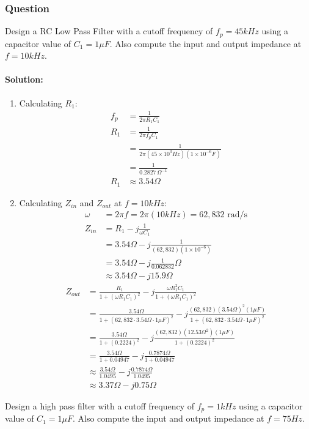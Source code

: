 \subsubsection{Question}
Design a RC Low Pass Filter with a cutoff frequency of
\(f_p = 45kHz\) using a capacitor value of \(C_1 = 1\mu F\).
Also compute the input and output impedance at
\(f = 10kHz\).
\paragraph{Solution:}
\begin{enumerate}
  \item Calculating \(R_1\):
    \begin{align*}
      f_p &= \frac{1}{2 \pi R_1 C_1} \\
      R_1 &= \frac{1}{2 \pi f_p C_1} \\
      &= \frac{1}{2 \pi (45 \times 10^3 Hz)(1 \times 10^{-6} F)} \\
      &= \frac{1}{0.2827 \, \Omega^{-1}} \\
      R_1 &\approx 3.54 \Omega
    \end{align*}
  \item Calculating \(Z_{in}\) and \(Z_{out}\) at \(f = 10kHz\):
    \begin{align*}
      \omega &= 2 \pi f = 2 \pi (10kHz) = 62,832 \text{ rad/s} \\
      Z_{in} &= R_1 - j \frac{1}{\omega C_1} \\
             &= 3.54 \Omega - j \frac{1}{(62,832)(1 \times 10^{-6})} \\
             &= 3.54 \Omega - j \frac{1}{0.062832} \Omega \\
             &\approx 3.54 \Omega - j 15.9 \Omega
    \end{align*}
    \begin{align*}
            Z_{out} &= \frac{R_1}{1 + (\omega R_1 C_1)^2} - j \frac{\omega R_1^2 C_1}{1 + (\omega R_1 C_1)^2} \\
              &= \frac{3.54 \Omega}{1 + (62,832 \cdot 3.54 \Omega \cdot 1\mu F)^2} - j \frac{(62,832)(3.54 \Omega)^2 (1\mu F)}{1 + (62,832 \cdot 3.54 \Omega \cdot 1\mu F)^2} \\
              &= \frac{3.54 \Omega}{1 + (0.2224)^2} - j \frac{(62,832)(12.53 \Omega^2)(1\mu F)}{1 + (0.2224)^2} \\
              &= \frac{3.54 \Omega}{1 + 0.04947} - j \frac{0.7874 \Omega}{1 + 0.04947} \\
              &\approx \frac{3.54 \Omega}{1.0495} - j \frac{0.7874 \Omega}{1.0495} \\
              &\approx 3.37 \Omega - j 0.75 \Omega
    \end{align*}
\end{enumerate}
Design a high pass filter with a cutoff frequency of
\(f_p = 1kHz\) using a capacitor value of \(C_1 = 1\mu F\).
Also compute the input and output impedance at
\(f = 75Hz\).
